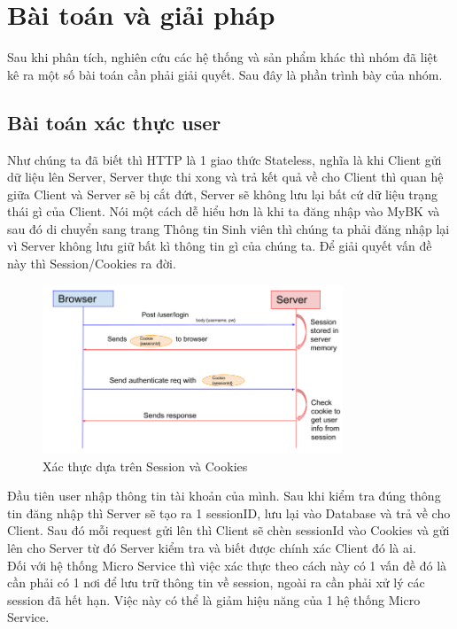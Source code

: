 \chapter{Bài toán và giải pháp}\label{chap:ProblemAndSolve}
		Sau khi phân tích, nghiên cứu các hệ thống và sản phẩm khác thì nhóm đã liệt kê ra một số bài toán cần phải giải quyết. Sau đây là phần trình bày của nhóm.
		
		\section{Bài toán xác thực user}
		Như chúng ta đã biết thì HTTP là 1 giao thức Stateless, nghĩa là khi Client gửi dữ liệu lên Server, Server thực thi xong và trả kết quả về cho Client thì quan hệ giữa Client và Server sẽ bị cắt đứt, Server sẽ không lưu lại bất cứ dữ liệu trạng thái gì của Client. Nói một cách dễ hiểu hơn là khi ta đăng nhập vào MyBK và sau đó di chuyển sang trang Thông tin Sinh viên thì chúng ta phải đăng nhập lại vì Server không lưu giữ bất kì thông tin gì của chúng ta. Để giải quyết vấn đề này thì Session/Cookies ra đời.
	
		\begin{figure}[H]
			\includegraphics[width=0.8\textwidth]{Images/session-cookies.png}
			\centering
			\linebreak
			\caption{Xác thực dựa trên Session và Cookies\cite{sessioncookies}}
		\end{figure}
		
		Đầu tiên user nhập thông tin tài khoản của mình. Sau khi kiểm tra đúng thông tin đăng nhập thì Server sẽ tạo ra 1 sessionID, lưu lại vào Database và trả về cho Client. Sau đó mỗi request gửi lên thì Client sẽ chèn sessionId vào Cookies và gửi lên cho Server từ đó Server kiểm tra và biết được chính xác Client đó là ai.\\
		
		Đối với hệ thống Micro Service thì việc xác thực theo cách này có 1 vấn đề đó là cần phải có 1 nơi để lưu trữ thông tin về session, ngoài ra cần phải xử lý các session đã hết hạn. Việc này có thể là giảm hiệu năng của 1 hệ thống Micro Service.\\
		
